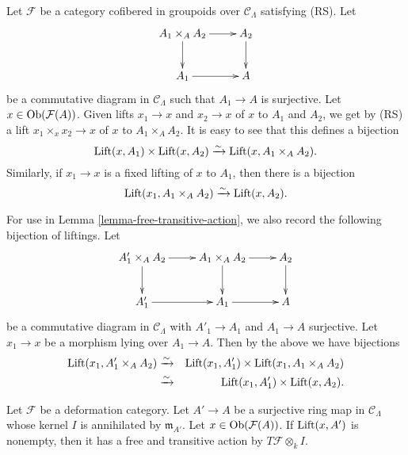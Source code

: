 \begin{remark}
\label{remark-lift-bijections}
Let $\mathcal F$ be a category cofibered in groupoids over $\mathcal 
C_{\Lambda}$ satisfying (RS).  Let
\[
\xymatrix{ 
A_1 \times_{A} A_2 \ar[r] \ar[d] & A_2 \ar[d] \\
A_1 \ar[r] & A
}
\]
be a commutative diagram in $\mathcal C_{\Lambda}$ such that $A_1 \rightarrow 
A$ is surjective.  Let $x \in \textnormal{Ob}(\mathcal F(A))$. Given lifts $x_1 
\rightarrow x$ and $x_2 \rightarrow x$ of $x$ to $A_1$ and $A_2$, we get by 
(RS) a lift $x_1 \times_{x} x_2 \rightarrow x$ of $x$ to $A_1 \times_{A} A_2$. 
It is easy to see that this defines a bijection
\[ \textnormal{Lift}(x,A_1) \times \textnormal{Lift}(x,A_2) \xrightarrow{\sim} 
\textnormal{Lift}(x, A_1 \times_{A} A_2) .\]
Similarly, if $x_1 \rightarrow x$ is a fixed lifting of $x$ to $A_1$, then 
there is a bijection
\[ \textnormal{Lift}(x_1, A_1 \times_{A} A_2) \xrightarrow{\sim} 
\textnormal{Lift}(x, A_2) .\]

\medskip \noindent 
For use in Lemma \ref{lemma-free-transitive-action}, we also record the 
following bijection of liftings.  Let
\[
\xymatrix{
A_1' \times_{A} A_2 \ar[r] \ar[d] & A_1 \times_{A} A_2 \ar[r] \ar[d] & A_2 
\ar[d] \\
A_1' \ar[r] & A_1 \ar[r] & A
}
\]
be a commutative diagram in $\mathcal C_{\Lambda}$ with $A'_1 \rightarrow A_1$ 
and $A_1 \rightarrow A$ surjective.  Let $x_1 \rightarrow x$ be a morphism 
lying over $A_1 \rightarrow A$.  Then by the above we have bijections
\begin{eqnarray*}
\textnormal{Lift}(x_1,A_1' \times_{A} A_2) & \xrightarrow{\sim} & 
\textnormal{Lift}(x_1,A_1') \times \textnormal{Lift}(x_1, A_1 \times_{A} A_2) 
\\ 
& \xrightarrow{\sim} & \textnormal{Lift}(x_1,A_1') \times \textnormal{Lift}(x, 
A_2).
\end{eqnarray*}
\end{remark}

\begin{lemma}
\label{lemma-free-transitive-action}
Let $\mathcal F$ be a deformation category.  Let $A' \rightarrow A$ be a 
surjective ring map in $\mathcal C_{\Lambda}$ whose kernel $I$ is annihilated 
by $\mathfrak{m}_{A'}$.  Let $x \in \textnormal{Ob}(\mathcal F(A))$.  If 
$\textnormal{Lift}(x,A')$ is nonempty, then it has a free and transitive action 
by $T\mathcal F \otimes_{k} I$. 
\end{lemma}

